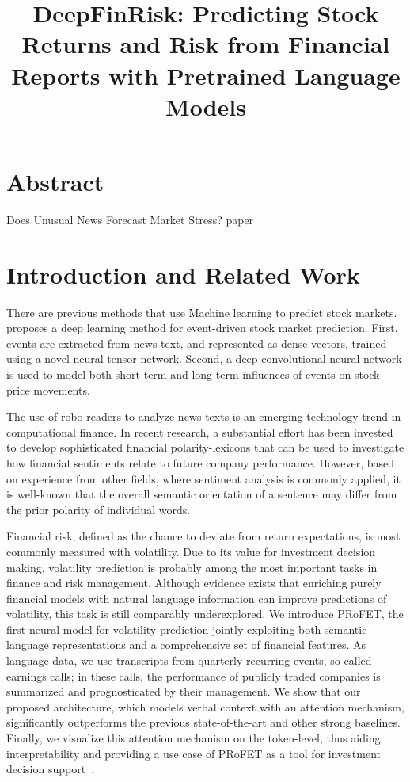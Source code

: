 \documentclass[11pt]{article}
\title{\vspace{-4cm} DeepFinRisk: Predicting Stock Returns and Risk
  from Financial Reports with Pretrained Language Models}
\author{}
\date{}
\begin{document}
\maketitle

\section{Abstract}

Does Unusual News Forecast Market Stress? paper

\section{Introduction and Related Work}

There are previous methods that use Machine learning to predict stock
markets.~\cite{ding2015} proposes a deep learning method for
event-driven stock market prediction. First, events are extracted from news text, and represented as dense vectors,
trained using a novel neural tensor network. Second, a deep convolutional neural network is used to model both short-term and
long-term influences of events on stock price movements.

The use of robo-readers to analyze news texts is an emerging technology trend in computational finance. In recent
research, a substantial effort has been invested to develop sophisticated financial polarity-lexicons that can be used to
investigate how financial sentiments relate to future company performance. However, based on experience from other
fields, where sentiment analysis is commonly applied, it is well-known
that the overall semantic orientation of a sentence may differ from the prior polarity of individual words.

Financial risk, defined as the chance to deviate from return expectations, is most commonly measured
with volatility. Due to its value for investment decision making, volatility prediction is probably
among the most important tasks in finance and risk management. Although evidence exists that enriching purely financial models with natural language
information can improve predictions of volatility, this task is still comparably underexplored. We introduce PRoFET, the
first neural model for volatility prediction jointly exploiting both
semantic language representations and a comprehensive set of financial
features. As language data, we use transcripts from quarterly
recurring events, so-called earnings calls; in these calls, the performance of publicly traded companies is summarized and prognosticated by their management. We show that our
proposed architecture, which models verbal context with an attention mechanism, significantly outperforms the previous state-of-the-art and other strong
baselines. Finally, we visualize this attention mechanism on the token-level, thus aiding interpretability and providing a use case of PRoFET as a tool
for investment decision support~\cite{theil2019}.
\end{document}
